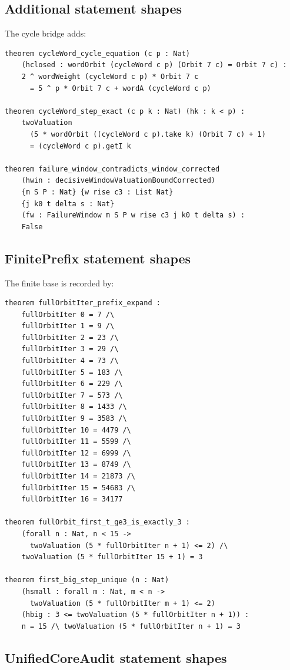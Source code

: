 \subsection{Additional statement shapes}

The cycle bridge adds:
\begin{verbatim}
theorem cycleWord_cycle_equation (c p : Nat)
    (hclosed : wordOrbit (cycleWord c p) (Orbit 7 c) = Orbit 7 c) :
    2 ^ wordWeight (cycleWord c p) * Orbit 7 c
      = 5 ^ p * Orbit 7 c + wordA (cycleWord c p)

theorem cycleWord_step_exact (c p k : Nat) (hk : k < p) :
    twoValuation
      (5 * wordOrbit ((cycleWord c p).take k) (Orbit 7 c) + 1)
      = (cycleWord c p).getI k

theorem failure_window_contradicts_window_corrected
    (hwin : decisiveWindowValuationBoundCorrected)
    {m S P : Nat} {w rise c3 : List Nat}
    {j k0 t delta s : Nat}
    (fw : FailureWindow m S P w rise c3 j k0 t delta s) :
    False
\end{verbatim}

\subsection{FinitePrefix statement shapes}

The finite base is recorded by:
\begin{verbatim}
theorem fullOrbitIter_prefix_expand :
    fullOrbitIter 0 = 7 /\
    fullOrbitIter 1 = 9 /\
    fullOrbitIter 2 = 23 /\
    fullOrbitIter 3 = 29 /\
    fullOrbitIter 4 = 73 /\
    fullOrbitIter 5 = 183 /\
    fullOrbitIter 6 = 229 /\
    fullOrbitIter 7 = 573 /\
    fullOrbitIter 8 = 1433 /\
    fullOrbitIter 9 = 3583 /\
    fullOrbitIter 10 = 4479 /\
    fullOrbitIter 11 = 5599 /\
    fullOrbitIter 12 = 6999 /\
    fullOrbitIter 13 = 8749 /\
    fullOrbitIter 14 = 21873 /\
    fullOrbitIter 15 = 54683 /\
    fullOrbitIter 16 = 34177

theorem fullOrbit_first_t_ge3_is_exactly_3 :
    (forall n : Nat, n < 15 ->
      twoValuation (5 * fullOrbitIter n + 1) <= 2) /\
    twoValuation (5 * fullOrbitIter 15 + 1) = 3

theorem first_big_step_unique (n : Nat)
    (hsmall : forall m : Nat, m < n ->
      twoValuation (5 * fullOrbitIter m + 1) <= 2)
    (hbig : 3 <= twoValuation (5 * fullOrbitIter n + 1)) :
    n = 15 /\ twoValuation (5 * fullOrbitIter n + 1) = 3
\end{verbatim}

\subsection{UnifiedCoreAudit statement shapes}

